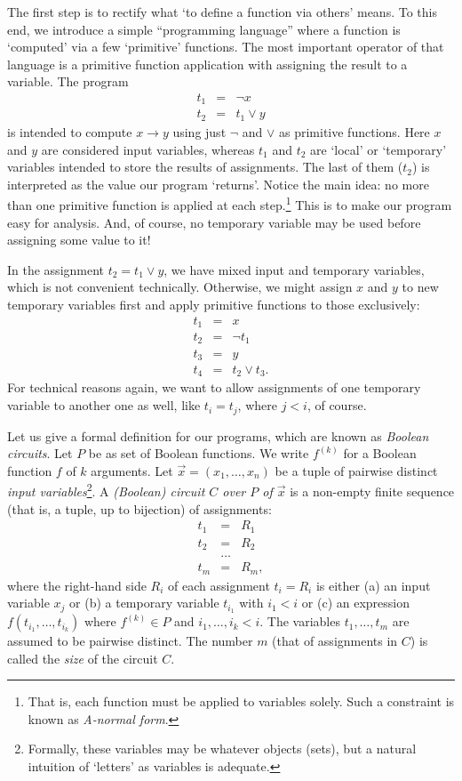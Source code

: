 \documentclass[12pt,notitlepage]{article}
\theoremstyle{plain}
\theoremstyle{definition}
\theoremstyle{plain}
\newcommand{\1}{\mathbf{1}}
\newcommand{\0}{\mathbf{0}}
\begin{document}
The first step is to rectify what `to define a function via others' means. To this end, we introduce a simple ``programming language'' where a function is `computed' via a few `primitive' functions. The most important operator of that language is a primitive function application with assigning the result to a variable. The program 
$$
\begin{array}{rcl}
t_1 &=& \neg x\\
t_2 &=& t_1 \vee y
\end{array}
$$
is intended to compute $x \to y$ using just $\neg$ and $\vee$ as primitive functions. Here $x$ and $y$ are considered input variables, whereas $t_1$ and $t_2$ are `local' or `temporary' variables intended to store the results of assignments. The last of them ($t_2$) is interpreted as the value our program `returns'. Notice the main idea: no more than one primitive function is applied at each step.\footnote{That is, each function must be applied to variables solely. Such a constraint is known as \emph{A-normal form}.} This is to make our program easy for analysis. And, of course, no temporary variable may be used before assigning some value to it!

In the assignment $t_2 = t_1 \vee y$, we have mixed input and temporary variables, which is not convenient technically. Otherwise, we might assign $x$ and $y$ to new temporary variables first and apply primitive functions to those exclusively:
$$
\begin{array}{rcl}
t_1 &=& x\\
t_2 &=& \neg t_1\\
t_3 &=& y\\
t_4 &=& t_2 \vee t_3.
\end{array}
$$
For technical reasons again, we want to allow assignments of one temporary variable to another one as well, like $t_i = t_j$, where $j < i$, of course.

Let us give a formal definition for our programs, which are known as \emph{Boolean circuits}. Let $P$ be as set of Boolean functions. We write $f^{(k)}$ for a Boolean function $f$ of $k$ arguments. Let $\vec x = (x_1, \ldots, x_n)$ be a tuple of pairwise distinct \emph{input variables}\footnote{Formally, these variables may be whatever objects (sets), but a natural intuition of `letters' as variables is adequate.}. A \emph{(Boolean) circuit $C$ over $P$ of $\vec x$} is a non-empty finite sequence (that is, a tuple, up to bijection) of assignments:
$$
\begin{array}{rcl}
t_1 &=& R_1\\
t_2 &=& R_2\\
&\ldots&\\
t_m &=& R_m,
\end{array}
$$
where the right-hand side $R_i$ of each assignment $t_i = R_i$ is either (a) an input variable $x_j$ or (b) a temporary variable $t_{i_1}$ with $i_1 < i$ or (c) an expression $f(t_{i_1},\ldots, t_{i_k})$ where $f^{(k)} \in P$ and $i_1,\ldots, i_k < i$. The variables $t_1,\ldots,t_m$ are assumed to be pairwise distinct. The number $m$ (that of assignments in $C$) is called the \emph{size} of the circuit $C$.
\end{document}
